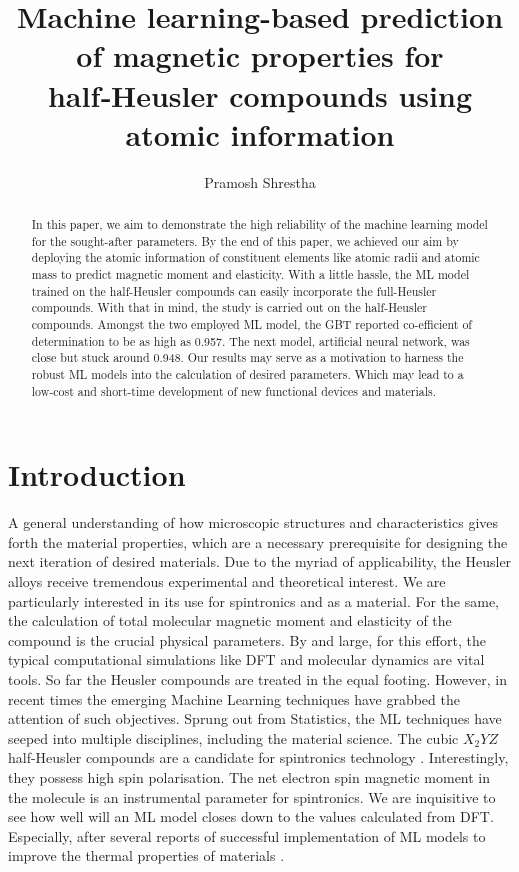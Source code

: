 \documentclass{article}
\title{Machine learning-based prediction of magnetic properties for half‑Heusler compounds using atomic information}
\author{Pramosh Shrestha}
\begin{document}
\maketitle

\begin{abstract}
In this paper, we aim to demonstrate the high reliability of the machine learning model for the sought-after parameters. By the end of this paper, we achieved our aim by deploying the atomic information of constituent elements like atomic radii and atomic mass to predict magnetic moment and elasticity. With a little hassle, the ML model trained on the half-Heusler compounds can easily incorporate the full-Heusler compounds. With that in mind, the study is carried out on the half-Heusler compounds. Amongst the two employed ML model, the GBT reported co-efficient of determination to be as high as 0.957. The next model, artificial neural network, was close but stuck around 0.948. Our results may serve as a motivation to harness the robust ML models into the calculation of desired parameters. Which may lead to a low‑cost and short-time development of new functional devices and materials.
\end{abstract}

\section{Introduction}
A general understanding of how microscopic structures and characteristics gives forth the material properties, which are a necessary prerequisite for designing the next iteration of desired materials. Due to the myriad of applicability, the Heusler alloys receive tremendous experimental and theoretical interest. We are particularly interested in its use for spintronics and as a material. For the same, the calculation of total molecular magnetic moment and elasticity of the compound is the crucial physical parameters. By and large, for this effort, the typical computational simulations like DFT and molecular dynamics are vital tools. So far the Heusler compounds are treated in the equal footing\cite{srivastava2020investigation, khandy2017dft}. However, in recent times the emerging Machine Learning techniques have grabbed the attention of such objectives. Sprung out from Statistics, the ML techniques have seeped into multiple disciplines, including the material science. The cubic ${X_2YZ}$ half-Heusler compounds are a candidate for spintronics technology \cite{de1983new, feng2014first, zhang2017two, ma2017computational, dehghan2019d0}. Interestingly, they possess high spin polarisation. The net electron spin magnetic moment in the molecule is an instrumental parameter for spintronics. We are inquisitive to see how well will an ML model closes down to the values calculated from DFT. Especially, after several reports of successful implementation of ML models to improve the thermal properties of materials \cite{wan2019materials, ouyang2020accuracy, ouyang2021machine, wang2021prediction, miyazaki2021machine}.
\end{document}
